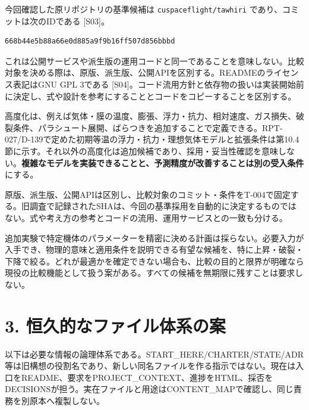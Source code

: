 \documentclass[11pt,a4paper]{article}
\begin{document}
今回確認した原リポジトリの基準候補は \texttt{cuspaceflight/tawhiri}
であり、コミットは次のIDである {[}S03{]}。

\begin{verbatim}
668b44e5b88a66e0d885a9f9b16ff507d856bbbd
\end{verbatim}

これは公開サービスや派生版の運用コードと同一であることを意味しない。比較対象を決める際は、原版、派生版、公開APIを区別する。READMEのライセンス表記はGNU
GPL 3である
{[}S04{]}。コード流用方針と依存物の扱いは実装開始前に決定し、式や設計を参考にすることとコードをコピーすることを区別する。

高度化は、例えば気体・膜の温度、膨張、浮力・抗力、相対速度、ガス損失、破裂条件、パラシュート展開、ばらつきを追加することで定義できる。RPT-027/D-139で定めた初期等温の浮力・抗力・理想気体モデルと拡張条件は第10.4節に示す。それ以外の高度化は追加候補であり、採用・妥当性確認を意味しない。\textbf{複雑なモデルを実装できることと、予測精度が改善することは別の受入条件}にする。

原版、派生版、公開APIは区別し、比較対象のコミット・条件をT-004で固定する。旧調査で記録されたSHAは、今回の基準採用を自動的に決定するものではない。式や考え方の参考とコードの流用、運用サービスとの一致も分ける。

追加実験で特定機体のパラメーターを精密に決める計画は採らない。必要入力が入手でき、物理的意味と適用条件を説明できる有望な候補を、特に上昇・破裂・下降で絞る。どれが最適かを確定できない場合も、比較の目的と限界が明確なら現役の比較機能として扱う案がある。すべての候補を無期限に残すことは要求しない。

\section{3.
恒久的なファイル体系の案}\label{ux6052ux4e45ux7684ux306aux30d5ux30a1ux30a4ux30ebux4f53ux7cfbux306eux6848}

以下は必要な情報の論理体系である。START\_HERE/CHARTER/STATE/ADR等は旧構想の役割名であり、新しい同名ファイルを作る指示ではない。現在は入口をREADME、要求をPROJECT\_CONTEXT、進捗をHTML、採否をDECISIONSが担う。実在ファイルと用途はCONTENT\_MAPで確認し、同じ責務を別原本へ複製しない。
\end{document}
